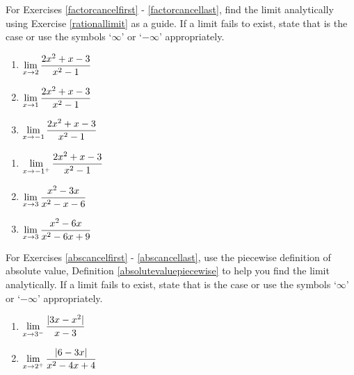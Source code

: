 \documentclass{ximera}
\begin{document}
For Exercises \ref{factorcancelfirst} - \ref{factorcancellast}, find the limit analytically using Exercise \ref{rationallimit} as a guide.  If a limit fails to exist, state that is the case  or use the symbols `$\infty$' or `$-\infty$' appropriately.
 
\begin{multicols}{3}

\begin{enumerate}
\setcounter{enumi}{\value{HW}}

\item\label{factorcancelfirst}  $\ds{\lim_{x \rightarrow 2} \dfrac{2x^2+x-3}{x^2-1}}$
  
\item  $\ds{\lim_{x \rightarrow 1} \dfrac{2x^2+x-3}{x^2-1}}$

\item   $\ds{\lim_{x \rightarrow -1} \dfrac{2x^2+x-3}{x^2-1}}$

\setcounter{HW}{\value{enumi}}
\end{enumerate}

\end{multicols}

\begin{multicols}{3}

\begin{enumerate}
\setcounter{enumi}{\value{HW}}

\item   $\ds{\lim_{x \rightarrow -1^{+}} \dfrac{2x^2+x-3}{x^2-1}}$

\item  $\ds{\lim_{x \rightarrow 3} \dfrac{x^2-3x}{x^2-x-6}}$

\item\label{factorcancellast}  $\ds{\lim_{x \rightarrow 3} \dfrac{x^2-6x}{x^2-6x+9}}$

\setcounter{HW}{\value{enumi}}
\end{enumerate}

\end{multicols}

For Exercises \ref{abscancelfirst} - \ref{abscancellast}, use the piecewise definition of absolute value, Definition \ref{absolutevaluepiecewise} to help you find the limit analytically.    If a limit fails to exist, state that is the case  or use the symbols `$\infty$' or `$-\infty$' appropriately.

\begin{multicols}{2}
\begin{enumerate}
\setcounter{enumi}{\value{HW}}

\item\label{abscancelfirst} $\ds{ \lim_{x \rightarrow 3^{-}} \dfrac{|3x - x^2| }{x-3}}$     

\item\label{abscancellast}  $\ds{\lim_{x \rightarrow 2^{+}} \dfrac{|6-3x|}{x^2-4x+4}}$

\setcounter{HW}{\value{enumi}}
\end{enumerate}
\end{multicols}
\end{document}
